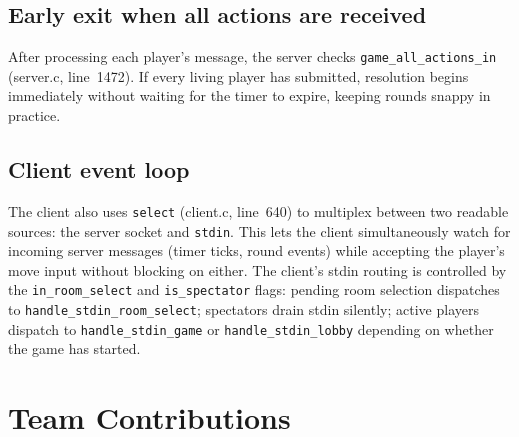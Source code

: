 \documentclass[11pt,letterpaper]{article}
\begin{document}
\subsection*{Early exit when all actions are received}

After processing each player's message, the server checks \texttt{game\_all\_actions\_in} (server.c, line~1472). If every living player has submitted, resolution begins immediately without waiting for the timer to expire, keeping rounds snappy in practice.

\subsection*{Client event loop}

The client also uses \texttt{select} (client.c, line~640) to multiplex between two readable sources: the server socket and \texttt{stdin}. This lets the client simultaneously watch for incoming server messages (timer ticks, round events) while accepting the player's move input without blocking on either. The client's stdin routing is controlled by the \texttt{in\_room\_select} and \texttt{is\_spectator} flags: pending room selection dispatches to \texttt{handle\_stdin\_room\_select}; spectators drain stdin silently; active players dispatch to \texttt{handle\_stdin\_game} or \texttt{handle\_stdin\_lobby} depending on whether the game has started.
\newpage

\section{Team Contributions}
\end{document}
